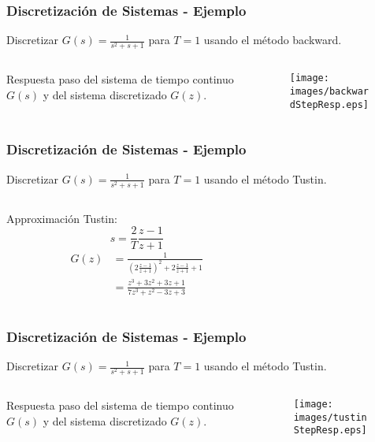 \documentclass[aspectratio=169]{beamer}
\theoremstyle{definition}
\theoremstyle{plain}
\theoremstyle{remark}
\begin{document}
\begin{frame}[c]\frametitle{Discretización de Sistemas - Ejemplo}
	\vspace*{3mm}	
	Discretizar $G(s) = \frac{1}{s^2 + s + 1}$ para $T=1$ usando el método backward.\\
	\begin{columns}
		\begin{column}{0.3\textwidth}
			Respuesta paso del sistema de tiempo continuo $G(s)$ y del sistema discretizado $G(z)$.
		\end{column}
		\begin{column}{0.7\textwidth}
			\begin{figure}
				\centering
				\texttt{[image: images/backwardStepResp.eps]}
			\end{figure}
		\end{column}
	\end{columns}
\end{frame}

\begin{frame}[c]\frametitle{Discretización de Sistemas - Ejemplo}
	\vspace*{3mm}	
	Discretizar $G(s) = \frac{1}{s^2 + s + 1}$ para $T=1$ usando el método Tustin.\\
	\pause
	\vspace*{4mm}	
	\begin{columns}
		\begin{column}{0.3\textwidth}
			Approximación Tustin:
			\begin{equation*}
				s = \frac{2}{T}\frac{z-1}{z+1}
			\end{equation*}
			\pause
			\begin{align*}
				G(z) &= \frac{1}{\left(2\frac{z-1}{z+1}\right)^2 + 2\frac{z-1}{z+1} + 1}\\
				&= \frac{z^3+3z^2+3z+1}{7z^3+z^2-3z+3}
			\end{align*}
		\end{column}
		\pause
		\begin{column}{0.7\textwidth}
			
		\end{column}
	\end{columns}
\end{frame}

\begin{frame}[c]\frametitle{Discretización de Sistemas - Ejemplo}
	\vspace*{3mm}	
	Discretizar $G(s) = \frac{1}{s^2 + s + 1}$ para $T=1$ usando el método Tustin.\\
	\begin{columns}
		\begin{column}{0.3\textwidth}
			Respuesta paso del sistema de tiempo continuo $G(s)$ y del sistema discretizado $G(z)$.
		\end{column}
		\begin{column}{0.7\textwidth}
			\begin{figure}
				\centering
				\texttt{[image: images/tustinStepResp.eps]}
			\end{figure}
		\end{column}
	\end{columns}
\end{frame}
\end{document}
